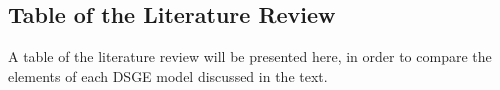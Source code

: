 \documentclass[
thesis.tex
]{subfiles}
\begin{document}
\newpage

\subsection{Table of the Literature Review}

A table of the literature review will be presented here, in order to compare the elements of each DSGE model discussed in the text.
\end{document}
